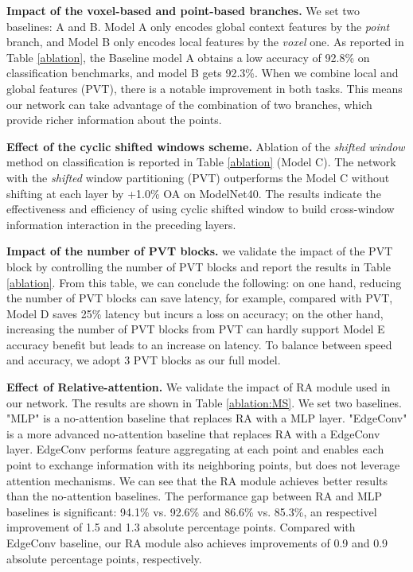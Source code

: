 \documentclass[10pt,twocolumn,letterpaper]{article}
\begin{document}
\textbf{Impact of the voxel-based and point-based branches.} We set two baselines: A and B. Model A only encodes global context features by the \emph{point} branch, and Model B only encodes local features by the \emph{voxel} one. As reported in Table \ref{ablation}, the Baseline model A obtains a low accuracy of 92.8\% on classification benchmarks, and model B gets 92.3\%. When we combine local and global features (PVT), there is a notable improvement in both tasks. This means our network can take advantage of the combination of two branches, which provide richer information about the points.

\textbf{Effect of the cyclic shifted windows scheme.} Ablation of the \emph{shifted window} method on classification is reported in Table \ref{ablation} (Model C). The network with the \emph{shifted} window partitioning (PVT) outperforms the Model C without shifting at each layer by +1.0\% OA on ModelNet40. The results indicate the effectiveness and efficiency of using cyclic shifted window to build cross-window information interaction in the preceding layers.

\textbf{Impact of the number of PVT blocks. } we validate the impact of the PVT block by controlling the number of PVT blocks and report the results in Table \ref{ablation}. From this table, we can conclude the following: on one hand, reducing the number of PVT blocks can save latency, for example, compared with PVT, Model D saves 25\% latency but incurs a loss on accuracy; on the other hand, increasing the number of PVT blocks from PVT can hardly support Model E accuracy benefit but leads to an increase on latency. To balance between speed and accuracy, we adopt 3 PVT blocks as our full model.

\textbf{Effect of Relative-attention.} We validate the impact of RA module used in our network. The results are shown in Table \ref{ablation:MS}. We set two baselines. "MLP" is a no-attention baseline that replaces RA with a MLP layer. "EdgeConv" is a more advanced no-attention baseline that replaces RA with a EdgeConv layer. EdgeConv performs feature aggregating at each point and enables each point to exchange information with its neighboring points, but does not leverage attention mechanisms. We can see that the RA module achieves better results than the no-attention baselines. The performance gap between RA and MLP baselines is significant: 94.1\% vs. 92.6\% and 86.6\% vs. 85.3\%, an respectivel improvement of 1.5 and 1.3 absolute percentage points. Compared with EdgeConv baseline, our RA module also achieves improvements of 0.9 and 0.9 absolute percentage points, respectively.
\end{document}
